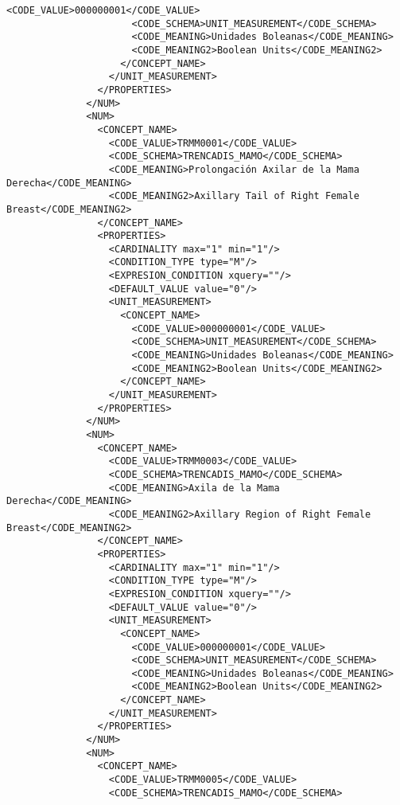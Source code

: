 \begin{lstlisting}[label=some-code,caption=Some Code]
                      <CODE_VALUE>000000001</CODE_VALUE>
                      <CODE_SCHEMA>UNIT_MEASUREMENT</CODE_SCHEMA>
                      <CODE_MEANING>Unidades Boleanas</CODE_MEANING>
                      <CODE_MEANING2>Boolean Units</CODE_MEANING2>
                    </CONCEPT_NAME>
                  </UNIT_MEASUREMENT>
                </PROPERTIES>
              </NUM>
              <NUM>
                <CONCEPT_NAME>
                  <CODE_VALUE>TRMM0001</CODE_VALUE>
                  <CODE_SCHEMA>TRENCADIS_MAMO</CODE_SCHEMA>
                  <CODE_MEANING>Prolongación Axilar de la Mama Derecha</CODE_MEANING>
                  <CODE_MEANING2>Axillary Tail of Right Female Breast</CODE_MEANING2>
                </CONCEPT_NAME>
                <PROPERTIES>
                  <CARDINALITY max="1" min="1"/>
                  <CONDITION_TYPE type="M"/>
                  <EXPRESION_CONDITION xquery=""/>
                  <DEFAULT_VALUE value="0"/>
                  <UNIT_MEASUREMENT>
                    <CONCEPT_NAME>
                      <CODE_VALUE>000000001</CODE_VALUE>
                      <CODE_SCHEMA>UNIT_MEASUREMENT</CODE_SCHEMA>
                      <CODE_MEANING>Unidades Boleanas</CODE_MEANING>
                      <CODE_MEANING2>Boolean Units</CODE_MEANING2>
                    </CONCEPT_NAME>
                  </UNIT_MEASUREMENT>
                </PROPERTIES>
              </NUM>
              <NUM>
                <CONCEPT_NAME>
                  <CODE_VALUE>TRMM0003</CODE_VALUE>
                  <CODE_SCHEMA>TRENCADIS_MAMO</CODE_SCHEMA>
                  <CODE_MEANING>Axila de la Mama Derecha</CODE_MEANING>
                  <CODE_MEANING2>Axillary Region of Right Female Breast</CODE_MEANING2>
                </CONCEPT_NAME>
                <PROPERTIES>
                  <CARDINALITY max="1" min="1"/>
                  <CONDITION_TYPE type="M"/>
                  <EXPRESION_CONDITION xquery=""/>
                  <DEFAULT_VALUE value="0"/>
                  <UNIT_MEASUREMENT>
                    <CONCEPT_NAME>
                      <CODE_VALUE>000000001</CODE_VALUE>
                      <CODE_SCHEMA>UNIT_MEASUREMENT</CODE_SCHEMA>
                      <CODE_MEANING>Unidades Boleanas</CODE_MEANING>
                      <CODE_MEANING2>Boolean Units</CODE_MEANING2>
                    </CONCEPT_NAME>
                  </UNIT_MEASUREMENT>
                </PROPERTIES>
              </NUM>
              <NUM>
                <CONCEPT_NAME>
                  <CODE_VALUE>TRMM0005</CODE_VALUE>
                  <CODE_SCHEMA>TRENCADIS_MAMO</CODE_SCHEMA>

\end{lstlisting}
